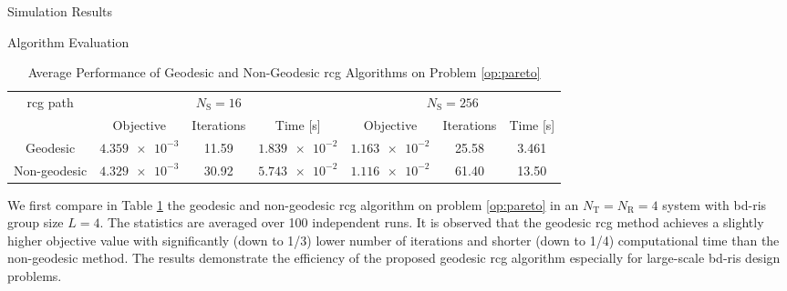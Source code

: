 \documentclass[journal]{IEEEtran}
\begin{document}
\begin{section}{Simulation Results}
	\begin{subsection}{Algorithm Evaluation}
		\begin{table}[!t]
			\caption{Average Performance of Geodesic and Non-Geodesic \gls{rcg} Algorithms on Problem \eqref{op:pareto}}
			\label{tb:complexity_test}
			\centering
			\begin{tabular}{ccccccc}
				\toprule
				\multirow{2}{*}{\gls{rcg} path} & \multicolumn{3}{c}{$N_\mathrm{S}=16$} & \multicolumn{3}{c}{$N_\mathrm{S}=256$}                                                               \\ \cmidrule(lr){2-4} \cmidrule(lr){5-7}
												& Objective                             & Iterations                             & Time [s]         & Objective        & Iterations & Time [s] \\ \midrule
				Geodesic                        & $\num{4.359e-3}$                      & 11.59                                  & $\num{1.839e-2}$ & $\num{1.163e-2}$ & 25.58      & 3.461    \\
				Non-geodesic                    & $\num{4.329e-3}$                      & 30.92                                  & $\num{5.743e-2}$ & $\num{1.116e-2}$ & 61.40      & 13.50    \\ \bottomrule
			\end{tabular}
		\end{table}
		We first compare in Table \ref{tb:complexity_test} the geodesic and non-geodesic \gls{rcg} algorithm on problem \eqref{op:pareto} in an $N_\mathrm{T}=N_\mathrm{R}=4$ system with \gls{bd}-\gls{ris} group size $L=4$.
		The statistics are averaged over \num{100} independent runs.
		It is observed that the geodesic \gls{rcg} method achieves a slightly higher objective value with significantly (down to 1/3) lower number of iterations and shorter (down to 1/4) computational time than the non-geodesic method.
		The results demonstrate the efficiency of the proposed geodesic \gls{rcg} algorithm especially for large-scale \gls{bd}-\gls{ris} design problems.
	\end{subsection}


\end{section}
\end{document}
